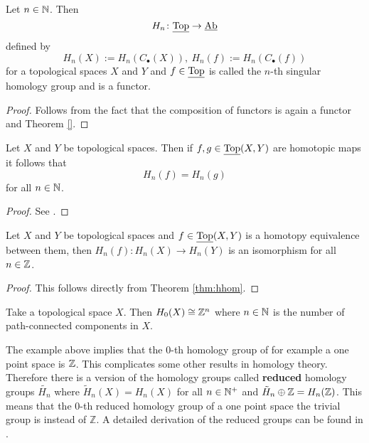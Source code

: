 \begin{thm}\label{thm:hfunc}
  Let $n \in \mathbb{N}$. Then \[H_n\colon \underline{\rm Top} \to \underline{\rm Ab} \]
  defined by \[H_n(X) := H_n(C_\bullet(X)), \: H_n(f) := H_n(C_\bullet(f))\]
  for a topological spaces $X$ and $Y$ and $f \in \underline{\rm Top}$ is called the $n$-th singular homology group and  is a functor. 
\end{thm}

\begin{proof}
  Follows from the fact that the composition of functors is again a functor and Theorem \ref{}.
\end{proof}

\begin{thm}\label{thm:hhom}
  Let $X$ and $Y$ be topological spaces. Then if $f, g\in \underline{\rm Top}(X, Y)$ are homotopic maps it follows that \[H_n(f) = H_n(g)\] for all $n \in \mathbb{N}$.
\end{thm}

\begin{proof}
  See \cite[p. 112f]{hatcher}.
\end{proof}

\begin{col}
  Let $X$ and $Y$ be topological spaces and $f \in \underline{\rm Top}(X, Y)$ is a homotopy equivalence between them, then $H_n(f)\colon H_n(X) \to H_n(Y)$ is an isomorphism for all $n \in \mathbb{Z}$.
\end{col}

\begin{proof}
  This follows directly from Theorem \ref{thm:hhom}.
\end{proof}

\begin{ex}
  Take a topological space $X$. Then $H_0(X) \cong \mathbb{Z}^n$ where $n \in \mathbb{N}$ is the number of path-connected components in $X$. 
\end{ex}

The example above implies that the $0$-th homology group of for example a one point space is $\mathbb{Z}$. This complicates some other results in homology theory. Therefore there is a version of the homology groups called \textbf{reduced} homology groups $\tilde{H_n}$ where $\tilde{H}_n(X) = H_n(X)$ for all $n \in\mathbb{N}^+$ and $\tilde{H}_n \oplus \mathbb{Z} = H_n(\mathbb{Z})$. This means that the $0$-th reduced homology group of a one point space the trivial group is instead of $\mathbb{Z}$.
A detailed derivation of the reduced groups can be found in \cite[p. 110]{hatcher}.

